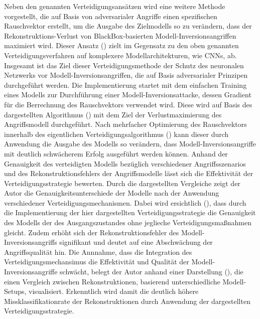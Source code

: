 Neben den genannten Verteidigungsansätzen wird eine weitere Methode vorgestellt, die auf Basis von \glqq adversarialer Angriffe\grqq{} einen spezifischen Rauschvektor erstellt, um die Ausgabe des Zielmodells so zu verändern, dass der Rekonstruktions-Verlust von BlackBox-basierten Modell-Inversionsangriffen maximiert wird. Dieser Ansatz (\cite{wen_defending_2021}) zielt im Gegensatz zu den oben genannten Verteidigungsverfahren auf komplexere Modellarchitekturen, wie CNNs, ab. Insgesamt ist das Ziel dieser Verteidigungsmethode der Schutz des neuronalen Netzwerks vor Modell-Inversionsangriffen, die auf Basis adversarialer Prinzipen durchgeführt werden. Die Implementierung startet mit dem einfachen Training eines Modells zur Durchführung einer Modell-Inversionsattacke, dessen Gradient für die Berrechnung des Rauschvektors verwendet wird. Diese wird auf Basis des dargestellten Algorithmus (\cite[S. 4, Algorithm 1]{wen_defending_2021}) mit dem Ziel der Verlustmaximierung des Angriffsmodell durchgeführt. Nach mehrfacher Optimierung des Rauschvektors innerhalb des eigentlichen Verteidigungsalgorithmus (\cite[S. 4, Algorithm 2]{wen_defending_2021}) kann dieser durch Anwendung die Ausgabe des Modells so verändern, dass Modell-Inversionsangriffe mit deutlich schwächerem Erfolg ausgeführt werden können. Anhand der Genauigkeit des \glqq verteidigten\grqq{} Modells bezüglich verschiedener Angriffsszenarios und des Rekonstruktionsfehlers der Angriffsmodelle lässt sich die Effektivität der Verteidigungsstrategie bewerten. Durch die dargestellten Vergleiche zeigt der Autor die Genauigkeitsunterschiede der Modelle nach der Anwendung verschiedener Verteidigungsmechanismen. Dabei wird ersichtlich (\cite[S. 5, Table 1]{wen_defending_2021}), dass durch die Implementierung der hier dargestellten Verteidigungsstrategie die Genauigkeit des Modells der des Ausgangszustandes ohne jeglieche Verteidigungsmaßnahmen gleicht. Zudem erhöht sich der Rekonstruktionsfehler des Modell-Inversionsangriffs signifikant und deutet auf eine Abschwächung der Angriffsqualität hin. Die Annnahme, dass die Integration des Verteidigungsmechansimus die Effektivität und Qualität der Modell-Inversionsangriffe schwächt, belegt der Autor anhand einer Darstellung (\cite[S. 5, Fig. 1]{wen_defending_2021}), die einen Vergleich zwischen Rekonstruktionen, basierend unterschiedliche Modell-Setups, visualisiert. Erkenntlich wird damit die deutlich höhere Missklassifikationrate der Rekonstruktionen durch Anwendung der dargestellten Verteidigungsstrategie.